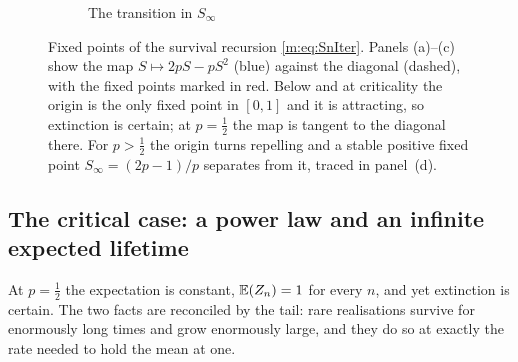\begin{figure}[htbp]
    \vspace{10pt}
    \begin{subfigure}[b]{0.55\textwidth}
    \centering
    \caption{The transition in $S_\infty$}
    \end{subfigure}

    \caption{Fixed points of the survival recursion \cref{m:eq:SnIter}. Panels
    (a)--(c) show the map $S\mapsto 2pS-pS^2$ (blue) against the diagonal (dashed),
    with the fixed points marked in red. Below and at criticality the origin is the
    only fixed point in $[0,1]$ and it is attracting, so extinction is certain; at
    $p=\tfrac12$ the map is tangent to the diagonal there. For $p>\tfrac12$ the
    origin turns repelling and a stable positive fixed point $S_\infty=(2p-1)/p$
    separates from it, traced in panel~(d).}
    \label{m:fig:phase_transition}
\end{figure}

\subsection*{The critical case: a power law and an infinite expected lifetime}
\label{m:sec:criticalcase}

At $p=\tfrac12$ the expectation is constant, $\mathbb{E}\!\left(Z_n\right)=1$ for every $n$, and yet
extinction is certain. The two facts are reconciled by the tail: rare realisations
survive for enormously long times and grow enormously large, and they do so at
exactly the rate needed to hold the mean at one.

